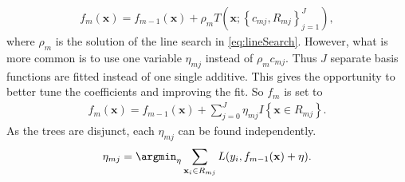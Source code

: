 \begin{align}
  f_m(\mathbf{x}) = f_{m-1}(\mathbf{x}) + \rho_m T(\mathbf{x}; \left\{ c_{m j}, R_{m j} \right\}_{j=1}^{J}),
\end{align}
where $\rho_m$ is the solution of the line search in \eqref{eq:lineSearch}.  However, what is more common is to use one variable $\eta_{m j}$ instead of $\rho_m c_{m j}$. Thus $J$ separate basis functions are fitted instead of one single additive. This gives the opportunity to better tune the coefficients and improving the fit. So $f_m$ is set to 
\begin{align}
  \label{eq:etaLineSearch} 
  f_m(\mathbf{x}) = f_{m-1}(\mathbf{x}) +  \sum^{J}_{j=0} \eta_{m j} I\left\{ \mathbf{x} \in R_{m j} \right\}.
\end{align}
As the trees are disjunct, each $\eta_{m j}$ can be found independently.
\begin{align}
  \eta_{m j} = \argmin_\eta  \sum_{\mathbf{x}_i \in R_{m j}} L(y_i, f_{m-1}(\mathbf{x}) + \eta).
\end{align}

